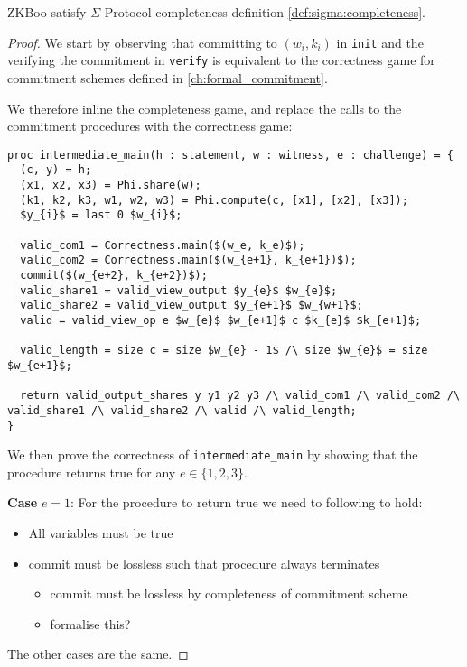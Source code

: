 \begin{lemma}
  \label{lem:zkboo:correctness}
  ZKBoo satisfy $\Sigma$-Protocol completeness definition \ref{def:sigma:completeness}.
\end{lemma}
\begin{proof}
We start by observing that committing to $(w_{i}, k_{i})$ in \texttt{init} and
the verifying the commitment in \texttt{verify} is equivalent to the correctness
game for commitment schemes defined in \ref{ch:formal_commitment}.

We therefore inline the completeness game, and replace the calls to the
commitment procedures with the correctness game:

\begin{lstlisting}[mathescape, label=lst:zkboo-inter-completeness,caption=
Intermediate game for completeness]
proc intermediate_main(h : statement, w : witness, e : challenge) = {
  (c, y) = h;
  (x1, x2, x3) = Phi.share(w);
  (k1, k2, k3, w1, w2, w3) = Phi.compute(c, [x1], [x2], [x3]);
  $y_{i}$ = last 0 $w_{i}$;

  valid_com1 = Correctness.main($(w_e, k_e)$);
  valid_com2 = Correctness.main($(w_{e+1}, k_{e+1})$);
  commit($(w_{e+2}, k_{e+2})$);
  valid_share1 = valid_view_output $y_{e}$ $w_{e}$;
  valid_share2 = valid_view_output $y_{e+1}$ $w_{w+1}$;
  valid = valid_view_op e $w_{e}$ $w_{e+1}$ c $k_{e}$ $k_{e+1}$;

  valid_length = size c = size $w_{e} - 1$ /\ size $w_{e}$ = size $w_{e+1}$;

  return valid_output_shares y y1 y2 y3 /\ valid_com1 /\ valid_com2 /\ valid_share1 /\ valid_share2 /\ valid /\ valid_length;
}
\end{lstlisting}

We then prove the correctness of \texttt{intermediate\_main} by showing that
the procedure returns true for any $e \in \{1,2,3\}$.

\vspace{3mm}
\noindent
\textbf{Case} $e = 1$:
For the procedure to return true we need to following to hold:

\begin{itemize}
  \item All variables must be true
  \item commit must be lossless such that procedure always terminates
    \begin{itemize}
      \item commit must be lossless by completeness of commitment scheme
      \item formalise this?
    \end{itemize}
\end{itemize}

The other cases are the same.

\end{proof}

